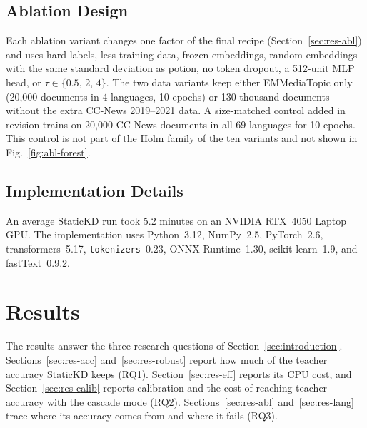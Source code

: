 \documentclass{ieeeaccess}
\begin{document}
\subsection{Ablation Design}
\label{sec:design}
Each ablation variant changes one factor of the final recipe (Section~\ref{sec:res-abl}) and uses hard labels, less training data, frozen embeddings, random embeddings with the same standard deviation as potion, no token dropout, a 512-unit MLP head, or $\tau\in\{0.5,\,2,\,4\}$. The two data variants keep either EMMediaTopic only (20,000 documents in 4 languages, 10 epochs) or 130 thousand documents without the extra CC-News 2019--2021 data. A size-matched control added in revision trains on 20,000 CC-News documents in all 69 languages for 10 epochs. This control is not part of the Holm family of the ten variants and not shown in Fig.~\ref{fig:abl-forest}.

\subsection{Implementation Details}
\label{sec:impl}
An average StaticKD run took 5.2 minutes on an NVIDIA RTX~4050 Laptop GPU. The implementation uses Python~3.12, NumPy~2.5, PyTorch~2.6, transformers~5.17, \texttt{tokenizers}~0.23, ONNX Runtime~1.30, scikit-learn~1.9, and fastText~0.9.2.

\section{Results}
\label{sec:results}
The results answer the three research questions of Section~\ref{sec:introduction}. Sections~\ref{sec:res-acc} and~\ref{sec:res-robust} report how much of the teacher accuracy StaticKD keeps (RQ1). Section~\ref{sec:res-eff} reports its CPU cost, and Section~\ref{sec:res-calib} reports calibration and the cost of reaching teacher accuracy with the cascade mode (RQ2). Sections~\ref{sec:res-abl} and~\ref{sec:res-lang} trace where its accuracy comes from and where it fails (RQ3).
\end{document}
